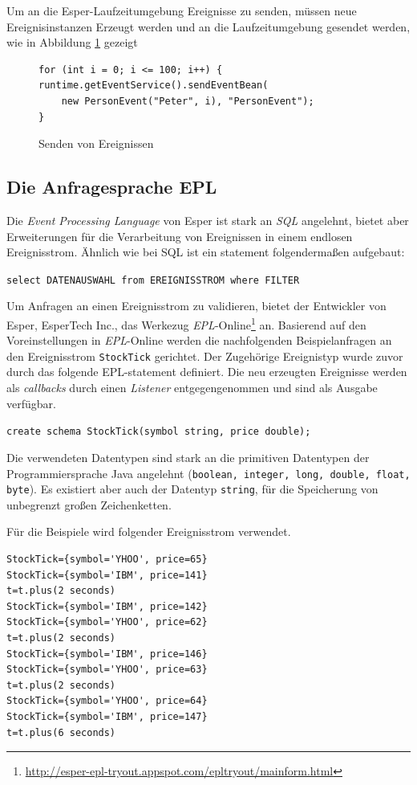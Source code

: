 \documentclass{acm_proc_article-sp}
\begin{document}
Um an die Esper-Laufzeitumgebung Ereignisse zu senden, müssen neue Ereignisinstanzen 
Erzeugt werden und an die Laufzeitumgebung gesendet werden, wie in Abbildung \ref{java:03}
gezeigt

\begin{figure}[h]    
\begin{verbatim}
for (int i = 0; i <= 100; i++) {
runtime.getEventService().sendEventBean(
    new PersonEvent("Peter", i), "PersonEvent");
}
\end{verbatim}
\caption{Senden von Ereignissen}
\label{java:03}
\end{figure}

\subsection{Die Anfragesprache EPL}\label{kap:epl}
\vspace{0.1cm}
Die \textit{Event Processing Language} von Esper ist stark an \textit{SQL} angelehnt, 
bietet aber Erweiterungen für die Verarbeitung von Ereignissen in einem endlosen 
Ereignisstrom. Ähnlich wie bei SQL ist ein statement folgendermaßen aufgebaut:

\texttt{select DATENAUSWAHL from EREIGNISSTROM where FILTER}

Um Anfragen an einen Ereignisstrom zu validieren, bietet der Entwickler von Esper, 
EsperTech Inc., das Werkezug 
\textit{EPL}-Online\footnote{\url{http://esper-epl-tryout.appspot.com/epltryout/mainform.html}}
an. Basierend auf den 
Voreinstellungen in \textit{EPL}-Online werden die nachfolgenden Beispielanfragen an den 
Ereignisstrom \texttt{StockTick} gerichtet. Der Zugehörige Ereignistyp wurde zuvor durch 
das folgende EPL-statement definiert. Die neu erzeugten Ereignisse werden als 
\textit{callbacks} durch einen \textit{Listener} entgegengenommen und sind als Ausgabe 
verfügbar.

\texttt{create schema StockTick(symbol string, price double);}

Die verwendeten Datentypen sind stark an die primitiven Datentypen der Programmiersprache 
Java angelehnt (\texttt{boolean, integer, long, double, float, byte}). Es existiert aber 
auch der Datentyp \texttt{string}, für die Speicherung von unbegrenzt großen 
Zeichenketten.

Für die Beispiele wird folgender Ereignisstrom verwendet.

\begin{verbatim}
StockTick={symbol='YHOO', price=65}
StockTick={symbol='IBM', price=141}
t=t.plus(2 seconds)
StockTick={symbol='IBM', price=142}
StockTick={symbol='YHOO', price=62}
t=t.plus(2 seconds)
StockTick={symbol='IBM', price=146}
StockTick={symbol='YHOO', price=63}
t=t.plus(2 seconds)
StockTick={symbol='YHOO', price=64}
StockTick={symbol='IBM', price=147}
t=t.plus(6 seconds)
\end{verbatim}
\end{document}
